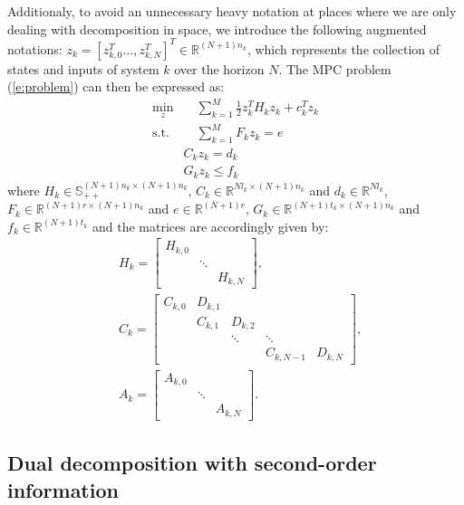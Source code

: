 Additionaly, to avoid an unnecessary heavy notation at places where we are only dealing with decomposition in space, we introduce the following augmented notations: $z_k = [z_{k,0}^T \dots, z_{k,N}^T]^T \in \mathbb{R}^{(N+1)n_k}$, which represents the collection of states and inputs of system $k$ over the horizon $N$. The MPC problem (\ref{e:problem}) can then be expressed as:
\begin{subequations}
\label{e:problem1}
\begin{align}
\min_z & \quad \sum_{k=1}^{M} \frac{1}{2}z_k^TH_k z_k + c_k^Tz_k \label{e:1} \\
\text{s.t.} & \quad \sum_{k=1}^{M} F_k z_k = e \label{e:CoupConst} \\
& C_k z_k = d_k \label{e:3} \\
& G_k z_k \leq f_k \label{e:ineqConst}
\end{align}
\end{subequations}
where $H_{k} \in \mathbb{S}_{++}^{(N+1)n_{k} \times (N+1)n_{k}}$, $C_{k} \in \mathbb{R}^{N l_{k} \times (N+1)n_{k}}$ and $d_{k} \in \mathbb{R}^{N l_{k}}$, $F_{k} \in \mathbb{R}^{(N+1) r \times (N+1) n_{k}}$ and $e \in \mathbb{R}^{(N+1)r}$, $G_{k} \in \mathbb{R}^{(N+1) t_{k} \times (N+1) n_{k}}$ and $f_{k} \in \mathbb{R}^{(N+1) t_{k}}$ and the matrices are accordingly given by:
\begin{subequations}
\begin{align*}
& H_k = \left[ \begin{array}{ccc}
H_{k,0} & & \\
 & \ddots & \\
 & & H_{k,N}
\end{array} \right], \\
& C_k = \left[ \begin{array}{ccccc} 
C_{k,0} & D_{k,1} &  &   &  \\
 & C_{k,1} & D_{k,2} &  &  \\
 &  & \ddots & \ddots &  \\
 &  &  & C_{k,N-1} & D_{k,N}
\end{array} \right], \\
& A_k = \left[ \begin{array}{ccc}
A_{k,0} & & \\
 & \ddots & \\
 & & A_{k,N}
\end{array} \right].
\end{align*}
\end{subequations}

\subsection{Dual decomposition with second-order information} \label{s:DualDecomposition}

